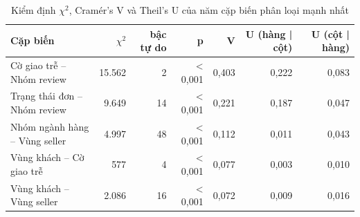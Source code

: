 \begin{table}[htbp]\centering\scriptsize\caption{Kiểm định $\chi^2$, Cramér's V và Theil's U của năm cặp biến phân loại mạnh nhất}\label{tab:p12c-chi2}
\begin{tabular}{p{4.6cm}rrrrrr}\toprule
\textbf{Cặp biến} & $\chi^2$ & \textbf{bậc tự do} & \textbf{p} & \textbf{V} & \textbf{U (hàng | cột)} & \textbf{U (cột | hàng)}\\\midrule
Cờ giao trễ -- Nhóm review & 15.562 & 2 & < 0,001 & 0,403 & 0,222 & 0,083\\
Trạng thái đơn -- Nhóm review & 9.649 & 14 & < 0,001 & 0,221 & 0,187 & 0,047\\
Nhóm ngành hàng -- Vùng seller & 4.997 & 48 & < 0,001 & 0,112 & 0,011 & 0,043\\
Vùng khách -- Cờ giao trễ & 577 & 4 & < 0,001 & 0,077 & 0,003 & 0,010\\
Vùng khách -- Vùng seller & 2.086 & 16 & < 0,001 & 0,072 & 0,009 & 0,016\\
\bottomrule\end{tabular}\end{table}
